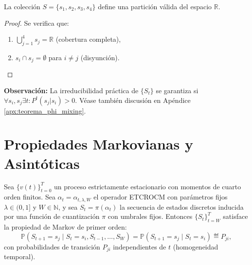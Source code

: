 \begin{lemma}
La colección \(S = \{s_1, s_2, s_3, s_4\}\) define una partición válida del espacio \(\mathbb{R}\).
\end{lemma}

\begin{proof}
Se verifica que:
\begin{enumerate}
\item \(\bigcup_{j=1}^4 s_j = \mathbb{R}\) (cobertura completa),
\item \(s_i \cap s_j = \emptyset\) para \(i \neq j\) (disyunción).
\end{enumerate}
\end{proof}

\textbf{Observación:} La irreducibilidad práctica de \(\{S_t\}\) se garantiza si \(\forall s_i,s_j \exists t: P^t(s_j|s_i) > 0\). Véase también discusión en Apéndice \ref{apx:teorema_phi_mixing}.

\section{Propiedades Markovianas y Asintóticas}
\label{sec:markov_propiedades}


\begin{theorem}
\label{thm:markov_primer_orden}
Sea $\{v(t)\}_{t=0}^T$ un proceso estrictamente estacionario con
momentos de cuarto orden finitos.  Sea $\alpha_t = \alpha_{t,\lambda,W}$
el operador ETCROCM con parámetros fijos $\lambda \in (0,1]$ y
$W \in \mathbb{N}$, y sea $S_t = \pi(\alpha_t)$ la secuencia de
estados discretos inducida por una función de cuantización $\pi$ con
umbrales fijos.  Entonces $\{S_t\}_{t=W}^{T}$ satisface
la propiedad de Markov de primer orden:
\[
\mathbb{P}(S_{t+1} = s_j \mid S_t = s_i, S_{t-1}, \ldots, S_W)
= \mathbb{P}(S_{t+1} = s_j \mid S_t = s_i)
\eqdef P_{ji},
\]
con probabilidades de transición $P_{ji}$ independientes de $t$
(homogeneidad temporal).
\end{theorem}

